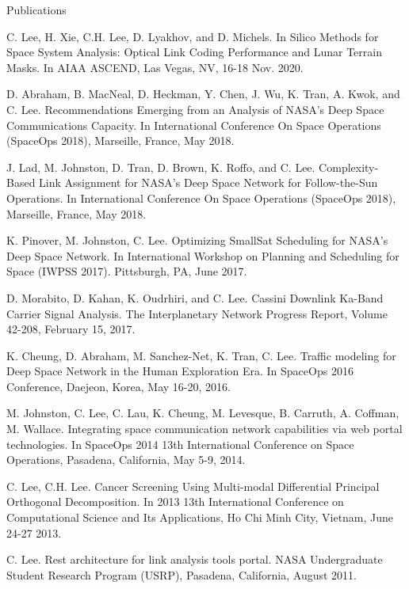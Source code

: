 \documentclass{resume} %
\begin{document}
\begin{rSection}{Publications}
\item C. Lee, H. Xie, C.H. Lee, D. Lyakhov, and D. Michels. In Silico Methods for Space System Analysis: Optical Link Coding Performance and Lunar Terrain Masks. In AIAA ASCEND, Las Vegas, NV, 16-18 Nov. 2020.

\item D. Abraham, B. MacNeal, D. Heckman, Y. Chen, J. Wu, K. Tran, A. Kwok, and C. Lee. Recommendations Emerging from an Analysis of NASA’s Deep Space Communications Capacity. In International Conference On Space Operations (SpaceOps 2018), Marseille, France, May 2018. 


\item J. Lad, M. Johnston, D. Tran, D. Brown, K. Roffo, and C. Lee. Complexity-Based Link Assignment for NASA’s Deep Space Network for Follow-the-Sun Operations. In International Conference On Space Operations (SpaceOps 2018), Marseille, France, May 2018. 

\item K. Pinover, M. Johnston, C. Lee. Optimizing SmallSat Scheduling for NASA’s Deep Space Network. In International Workshop on Planning and Scheduling for Space (IWPSS 2017). Pittsburgh, PA, June 2017. 


\item D. Morabito, D. Kahan, K. Oudrhiri, and C. Lee. Cassini Downlink Ka-Band Carrier Signal Analysis. The Interplanetary Network Progress Report, Volume 42-208, February 15, 2017. 


\item K. Cheung, D. Abraham, M. Sanchez-Net, K. Tran, C. Lee. Traffic modeling for Deep Space Network in the Human Exploration Era. In SpaceOps 2016 Conference, Daejeon, Korea, May 16-20, 2016.


\item M. Johnston, C. Lee, C. Lau, K. Cheung, M. Levesque, B. Carruth, A. Coffman, M. Wallace. Integrating space communication network capabilities via web portal technologies. In SpaceOps 2014 13th International Conference on Space Operations, Pasadena, California, May 5-9, 2014. 


\item C. Lee, C.H. Lee. Cancer Screening Using Multi-modal Differential Principal Orthogonal Decomposition. In 2013 13th International Conference on Computational Science and Its Applications, Ho Chi Minh City, Vietnam, June 24-27 2013.


\item C. Lee. Rest architecture for link analysis tools portal. NASA Undergraduate Student Research Program (USRP), Pasadena, California, August 2011. 




\end{rSection}
\end{document}

